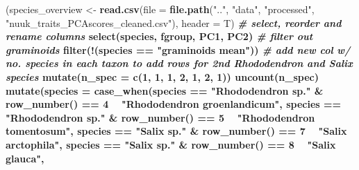 \documentclass[
]{article}
\newenvironment{Shaded}{\begin{snugshade}}{\end{snugshade}}
\newcommand{\CommentTok}[1]{\textcolor[rgb]{0.56,0.35,0.01}{\textit{#1}}}
\newcommand{\DataTypeTok}[1]{\textcolor[rgb]{0.13,0.29,0.53}{#1}}
\newcommand{\DecValTok}[1]{\textcolor[rgb]{0.00,0.00,0.81}{#1}}
\newcommand{\KeywordTok}[1]{\textcolor[rgb]{0.13,0.29,0.53}{\textbf{#1}}}
\newcommand{\NormalTok}[1]{#1}
\newcommand{\OperatorTok}[1]{\textcolor[rgb]{0.81,0.36,0.00}{\textbf{#1}}}
\newcommand{\StringTok}[1]{\textcolor[rgb]{0.31,0.60,0.02}{#1}}
\begin{document}
\begin{Shaded}
\begin{Highlighting}[]
\NormalTok{(species_overview <-}\StringTok{ }\KeywordTok{read.csv}\NormalTok{(}\DataTypeTok{file =} \KeywordTok{file.path}\NormalTok{(}\StringTok{".."}\NormalTok{, }\StringTok{"data"}\NormalTok{, }\StringTok{"processed"}\NormalTok{, }\StringTok{"nuuk_traits_PCAscores_cleaned.csv"}\NormalTok{),}
                               \DataTypeTok{header =}\NormalTok{ T) }\OperatorTok{%>%}\StringTok{ }
\StringTok{  }
\StringTok{   }\CommentTok{# select, reorder and rename columns}
\StringTok{   }\KeywordTok{select}\NormalTok{(species,}
\NormalTok{          fgroup,}
\NormalTok{          PC1,}
\NormalTok{          PC2) }\OperatorTok{%>%}\StringTok{ }
\StringTok{   }
\StringTok{   }\CommentTok{# filter out graminoids}
\StringTok{   }\KeywordTok{filter}\NormalTok{(}\OperatorTok{!}\NormalTok{(species }\OperatorTok{==}\StringTok{ "graminoids mean"}\NormalTok{)) }\OperatorTok{%>%}\StringTok{ }
\StringTok{   }
\StringTok{   }\CommentTok{# add new col w/ no. species in each taxon to add rows for 2nd Rhododendron and Salix species}
\StringTok{   }\KeywordTok{mutate}\NormalTok{(}\DataTypeTok{n_spec =} \KeywordTok{c}\NormalTok{(}\DecValTok{1}\NormalTok{, }\DecValTok{1}\NormalTok{, }\DecValTok{1}\NormalTok{, }\DecValTok{2}\NormalTok{, }\DecValTok{1}\NormalTok{, }\DecValTok{2}\NormalTok{, }\DecValTok{1}\NormalTok{)) }\OperatorTok{%>%}\StringTok{ }
\StringTok{   }\KeywordTok{uncount}\NormalTok{(n_spec) }\OperatorTok{%>%}\StringTok{ }
\StringTok{   }
\StringTok{   }\KeywordTok{mutate}\NormalTok{(}\DataTypeTok{species =} \KeywordTok{case_when}\NormalTok{(species }\OperatorTok{==}\StringTok{ "Rhododendron sp."} \OperatorTok{&}\StringTok{ }\KeywordTok{row_number}\NormalTok{() }\OperatorTok{==}\StringTok{ }\DecValTok{4} \OperatorTok{~}\StringTok{ "Rhododendron groenlandicum"}\NormalTok{,}
\NormalTok{                              species }\OperatorTok{==}\StringTok{ "Rhododendron sp."} \OperatorTok{&}\StringTok{ }\KeywordTok{row_number}\NormalTok{() }\OperatorTok{==}\StringTok{ }\DecValTok{5} \OperatorTok{~}\StringTok{ "Rhododendron tomentosum"}\NormalTok{,}
\NormalTok{                              species }\OperatorTok{==}\StringTok{ "Salix sp."} \OperatorTok{&}\StringTok{ }\KeywordTok{row_number}\NormalTok{() }\OperatorTok{==}\StringTok{ }\DecValTok{7} \OperatorTok{~}\StringTok{ "Salix arctophila"}\NormalTok{,}
\NormalTok{                              species }\OperatorTok{==}\StringTok{ "Salix sp."} \OperatorTok{&}\StringTok{ }\KeywordTok{row_number}\NormalTok{() }\OperatorTok{==}\StringTok{ }\DecValTok{8} \OperatorTok{~}\StringTok{ "Salix glauca"}\NormalTok{,}
}}}}}
\end{Highlighting}
\end{Shaded}
\end{document}
